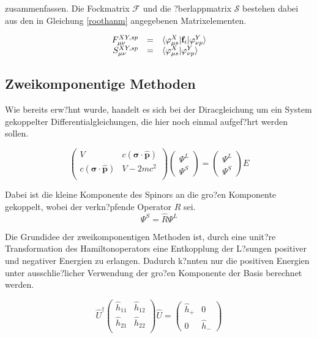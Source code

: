 zusammenfassen. Die Fockmatrix $\mathcal{F}$ und die ?berlappmatrix $\mathcal{S}$ bestehen dabei aus den in Gleichung \ref{roothanm} angegebenen Matrixelementen.

\begin{equation}\begin{array}{rcl}\label{roothanm}
F^{XY,sp}_{\mu\nu} &=& \braket{\varphi^X_{\mu s}|\mathbf{f}_i|\varphi_{\nu p}^Y}\\
S^{XY,sp}_{\mu\nu} &=& \braket{\varphi^X_{\mu s}|\varphi_{\nu p}^Y}
\end{array}\end{equation}


\subsection{Zweikomponentige Methoden}
Wie bereits erw?hnt wurde, handelt es sich bei der Diracgleichung um ein System gekoppelter Differentialgleichungen, die hier noch einmal aufgef?hrt werden sollen.

\begin{equation}\label{koppdirac}
\left(\begin{array}{ll}
V & c(\mathbf{\sigma}\cdot\hat{\mathbf{p}})\\
c(\mathbf{\sigma}\cdot\hat{\mathbf{p}}) & V -2mc^2\\\end{array}\right)
\begin{pmatrix}\Psi^L\\\Psi^S\end{pmatrix}
= \begin{pmatrix}\Psi^L\\\Psi^S\end{pmatrix} E
\end{equation}

Dabei ist die kleine Komponente des Spinors an die gro?en Komponente gekoppelt, wobei der verkn?pfende Operator $\hat{R}$ sei.
\begin{equation}
\Psi^S = \hat{R}\Psi^L
\end{equation}

Die Grundidee der zweikomponentigen Methoden ist, durch eine unit?re Transformation des Hamiltonoperators eine Entkopplung der L?sungen positiver und negativer Energien zu erlangen. Dadurch k?nnten nur die positiven Energien unter ausschlie?licher Verwendung der gro?en Komponente der Basis berechnet werden.

\begin{equation}
\hat{U}^\dagger\left(\begin{array}{cc}
\hat{h}_{11} & \hat{h}_{12}\\
\hat{h}_{21} & \hat{h}_{22}\\\end{array}\right) \hat{U}=
\left(\begin{array}{cc}
\hat{h}_+ & 0 \\
0         & \hat{h}_-
\end{array}\right)
\end{equation}

